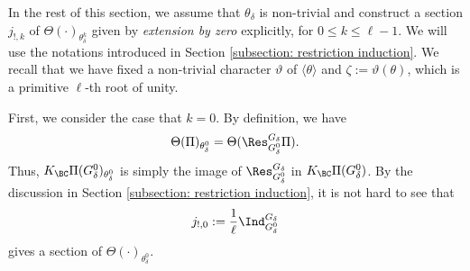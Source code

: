 \documentclass[11pt,letterpaper]{amsart}
\numberwithin{equation}{section}
\begin{document}
In the rest of this section, we assume that $\theta_{\delta}$ is non-trivial and construct a section $j_{!,k}$ of $\Theta(\cdot)_{\theta_{\delta}^k}$ given by {\it extension by zero} explicitly, for $0 \leq k \leq \ell-1$. We will use the notations introduced in Section \ref{subsection: restriction induction}. We recall that we have fixed a non-trivial character $\vartheta$ of $\langle \theta \rangle$ and $\zeta:= \vartheta(\theta)$, which is a primitive $\ell$-th root of unity.


First, we consider the case that $k=0$. By definition, we have 
\[ \Theta(\Pi)_{\theta_{\delta}^0}= \Theta( \Res_{G_{\delta}^0}^{G_{\delta}}\Pi). \]
Thus, $K_{\BC}\Pi(G_{\delta}^0)_{\theta_{\delta}^0}$ is simply the image of $\Res_{G_{\delta}^0}^{G_{\delta}}$ in $K_{\BC}\Pi(G_{\delta}^0)$. By the discussion in Section \ref{subsection: restriction induction}, it is not hard to see that 
\[ j_{!,0}:= \frac{1}{\ell} \Ind_{G_{\delta}^0}^{G_{\delta}}\]
gives a section of $\Theta(\cdot)_{\theta_{\delta}^0}$.
\end{document}
